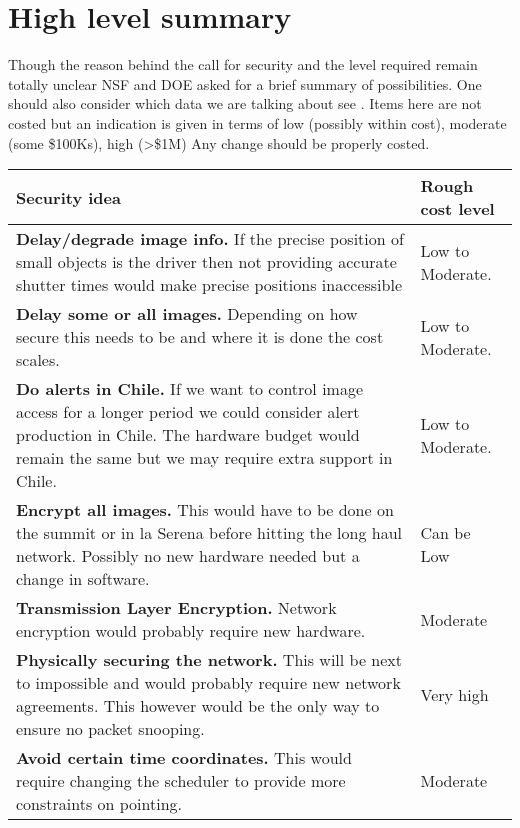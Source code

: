 \section{High level summary}\label{sec:sum}
Though the reason behind the call for security and the level required remain totally unclear
NSF and DOE asked for a brief summary of possibilities.
One should also consider which data we are talking about see .
Items here are not costed but an indication is given in terms of low (possibly within cost), moderate (some \$100Ks), high (>\$1M)
Any change should be properly costed.


\begin{longtable}{p{} p{}}\hline
\textbf{Security idea} & \textbf{Rough cost level}  \\\hline
 {\bf Delay/degrade image info.} If the precise position of small objects is the driver then not providing accurate shutter times would make precise positions inaccessible & Low to Moderate.\\
 {\bf Delay some or all images.} Depending on how secure this needs to be and where it is done the cost scales.  & Low to Moderate.\\
 {\bf Do alerts in Chile.} If we want to control image access for a longer period we could consider alert production in Chile. The hardware budget would remain the same but we may require extra support in Chile.  & Low to Moderate.\\
{\bf Encrypt all images.} This would have to be done on the summit or in la Serena before hitting the long haul network. Possibly no new hardware needed but a change in software.  & Can be Low \\
{\bf Transmission Layer Encryption.} Network encryption would probably require new hardware. & Moderate \\
{\bf Physically securing the network.} This will be next to impossible and would probably require new network agreements. This however would be the only way to ensure no packet snooping. & Very high \\
{\bf Avoid certain time coordinates.} This would require changing the scheduler to provide more constraints on pointing. &  Moderate  \\\hline
\end{longtable}
